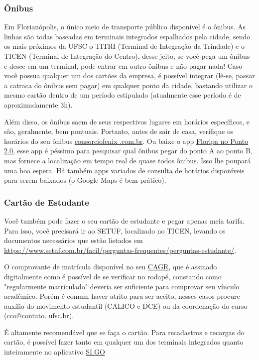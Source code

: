 \subsubsection{Ônibus}
Em Florianópolis, o único meio de transporte público disponível é o ônibus. As linhas são todas baseadas em terminais integrados espalhados pela cidade, sendo os mais próximos da UFSC o TITRI (Terminal de Integração da Trindade) e o TICEN (Terminal de Integração do Centro), desse jeito, se você pega um ônibus e desce em um terminal, pode entrar em outro ônibus e não pagar nada! Caso você possua qualquer um dos cartões da empresa, é possível integrar (lê-se, passar a catraca do ônibus sem pagar) em qualquer ponto da cidade, bastando utilizar o mesmo cartão dentro de um período estipulado (atualmente esse período é de aproximadamente 3h).

Além disso, os ônibus saem de seus respectivos lugares em horários específicos, e são, geralmente, bem pontuais.
Portanto, antes de sair de casa, verifique os horários do seu ônibus \href{consorciofenix.com.br}{consorciofenix .com.br}.
Ou baixe o app \href{https://play.google.com/store/search?q=floripa%20no%20ponto}{Floripa no Ponto 2.0}, esse app é péssimo para pesquisar qual ônibus pegar do ponto A ao ponto B, mas fornece a localização em tempo real de quase todos ônibus. Isso lhe poupará uma boa espera. Há também apps variados de consulta de horários disponíveis para serem baixados (o Google Maps é bem prático).

\subsubsection{Cartão de Estudante}

Você também pode fazer o seu cartão de estudante e pegar apenas meia tarifa.
Para isso, você precisará ir ao SETUF, localizado no TICEN, levando os documentos necessários que estão listados em \href{https://www.setuf.com.br/facil/perguntas-frequentes/perguntas-estudante/}{https://www.setuf.com.br/facil/perguntas-frequentes/perguntas-estudante/}.

O comprovante de matrícula disponível no seu \href{https://cagr.sistemas.ufsc.br/relatorios/aluno/atestadoMatricula?download}{CAGR},
que é assinado digitalmente como é possível de se verificar no rodapé, constando como "regularmente matriculado" deveria ser suficiente para comprovar seu vínculo acadêmico.
Porém é comum haver atrito para ser aceito, nesses casos procure auxílio do movimento estudantil (CALICO e DCE) ou da coordenação do curso (cco@contato. ufsc.br).

É altamente recomendável que se faça o cartão.
Para recadastros e recargas do cartão, é possível fazer tanto em qualquer um dos terminais integrados quanto inteiramente no aplicativo \href{https://play.google.com/store/apps/details?id=br.com.henkoti.empresa1.smpay}{SI.GO}
